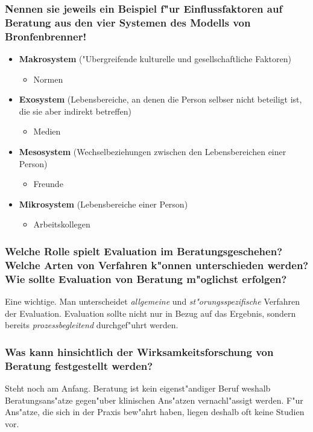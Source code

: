 \subsubsection{Nennen sie jeweils ein Beispiel f"ur Einflussfaktoren auf Beratung aus den vier Systemen des Modells von Bronfenbrenner!}
\begin{itemize}
        \item \textbf{Makrosystem} ("Ubergreifende kulturelle und gesellschaftliche Faktoren) 
                \begin{itemize}
                        \item Normen
                \end{itemize}
        \item \textbf{Exosystem} (Lebensbereiche, an denen die Person selbser nicht beteiligt ist, die sie aber indirekt betreffen)
                \begin{itemize}
                        \item Medien
                \end{itemize}
        \item \textbf{Mesosystem} (Wechselbeziehungen zwischen den Lebensbereichen einer Person)
                \begin{itemize}
                        \item Freunde
                \end{itemize}
        \item \textbf{Mikrosystem} (Lebensbereiche einer Person)
                \begin{itemize}
                        \item Arbeitskollegen
                \end{itemize}
\end{itemize}

\subsubsection{Welche Rolle spielt Evaluation im Beratungsgeschehen? Welche Arten von Verfahren k"onnen unterschieden werden? Wie sollte Evaluation von Beratung m"oglichst erfolgen?}
Eine wichtige. Man unterscheidet \emph{allgemeine} und \emph{st"orungsspezifische} Verfahren der Evaluation. Evaluation sollte nicht nur in Bezug auf das Ergebnis, sondern bereits \emph{prozessbegleitend} durchgef"uhrt werden.

\subsubsection{Was kann hinsichtlich der Wirksamkeitsforschung von Beratung festgestellt werden?}
Steht noch am Anfang. Beratung ist kein eigenst"andiger Beruf weshalb Beratungsans"atze gegen"uber klinischen Ans"atzen vernachl"assigt werden. F"ur Ans"atze, die sich in der Praxis bew"ahrt haben, liegen deshalb oft keine Studien vor.

